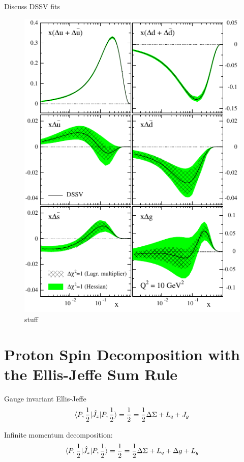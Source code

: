 Discuss DSSV fits
\begin{figure}
  \centering
  \includegraphics[width=\linewidth]{./figures/polarized_pdfs_dssv.pdf}
  \caption{
    stuff    
  }
  \label{fig:dssv_pdfs}
\end{figure}

\section{Proton Spin Decomposition with the Ellis-Jeffe Sum Rule }

{\noindent}Gauge invariant Ellis-Jeffe
\begin{equation}
  \braket{P,{1\over2}|\hat{J_z}|P,{1\over2}}  
 = {1\over2} = {{1\over2}\Delta \Sigma +L_q+J_g}
\label{eq:ellis_jeffe_sum}
\end{equation}

{\noindent}Infinite momentum decomposition:
\begin{equation}
  \braket{P,{1\over2}|\hat{J_z}|P,{1\over2}}  
  = {1\over2} = {{1\over2}\Delta \Sigma +L_q+\Delta g + L_g}
  \label{eq:infmom_ellis_jeffe_sum}
\end{equation}

